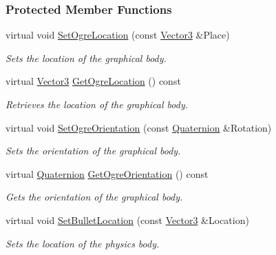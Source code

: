 \subsubsection*{Protected Member Functions}
\begin{DoxyCompactItemize}
\item 
virtual void \hyperlink{classphys_1_1ActorBase_af971411076dc0caeb10868e563c49549}{SetOgreLocation} (const \hyperlink{classphys_1_1Vector3}{Vector3} \&Place)
\begin{DoxyCompactList}\small\item\em Sets the location of the graphical body. \item\end{DoxyCompactList}\item 
virtual \hyperlink{classphys_1_1Vector3}{Vector3} \hyperlink{classphys_1_1ActorBase_a12ef0a2625e2fdf506ea8e23e0a378fa}{GetOgreLocation} () const 
\begin{DoxyCompactList}\small\item\em Retrieves the location of the graphical body. \item\end{DoxyCompactList}\item 
virtual void \hyperlink{classphys_1_1ActorBase_a3b7de85c73621ce1e74ffc9837efba90}{SetOgreOrientation} (const \hyperlink{classphys_1_1Quaternion}{Quaternion} \&Rotation)
\begin{DoxyCompactList}\small\item\em Sets the orientation of the graphical body. \item\end{DoxyCompactList}\item 
virtual \hyperlink{classphys_1_1Quaternion}{Quaternion} \hyperlink{classphys_1_1ActorBase_a70ca5364c59d7246146f9b7fce811d7f}{GetOgreOrientation} () const 
\begin{DoxyCompactList}\small\item\em Gets the orientation of the graphical body. \item\end{DoxyCompactList}\item 
virtual void \hyperlink{classphys_1_1ActorBase_a5ff883ae10ba5672381485f79d6b456d}{SetBulletLocation} (const \hyperlink{classphys_1_1Vector3}{Vector3} \&Location)
\begin{DoxyCompactList}\small\item\em Sets the location of the physics body. \item\end{DoxyCompactList}\item 

\end{DoxyCompactItemize}
